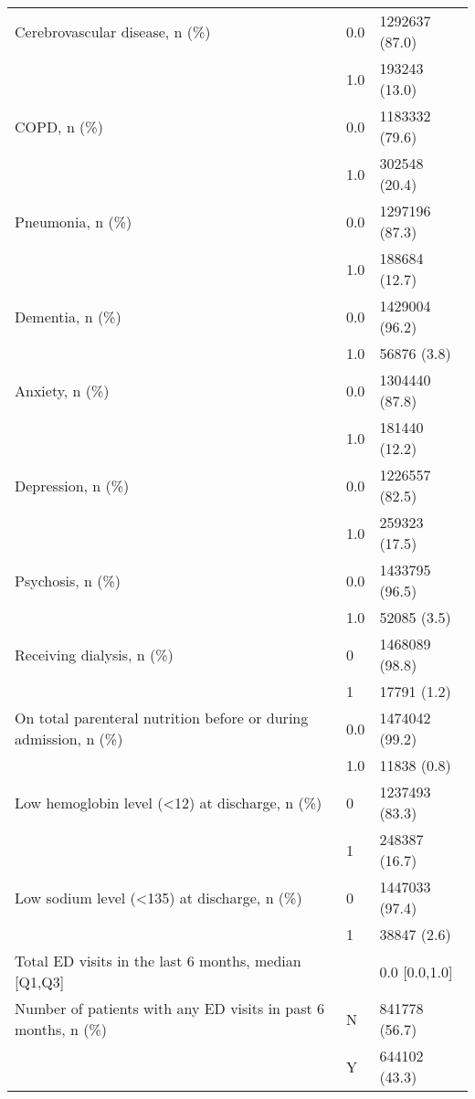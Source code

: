 \begin{tabular}{lll}
Cerebrovascular disease, n (\%) & 0.0 &     1292637 (87.0) \\
                                       & 1.0 &      193243 (13.0) \\
COPD, n (\%) & 0.0 &     1183332 (79.6) \\
                                       & 1.0 &      302548 (20.4) \\
Pneumonia, n (\%) & 0.0 &     1297196 (87.3) \\
                                       & 1.0 &      188684 (12.7) \\
Dementia, n (\%) & 0.0 &     1429004 (96.2) \\
                                       & 1.0 &        56876 (3.8) \\
Anxiety, n (\%) & 0.0 &     1304440 (87.8) \\
                                       & 1.0 &      181440 (12.2) \\
Depression, n (\%) & 0.0 &     1226557 (82.5) \\
                                       & 1.0 &      259323 (17.5) \\
Psychosis, n (\%) & 0.0 &     1433795 (96.5) \\
                                       & 1.0 &        52085 (3.5) \\
Receiving dialysis, n (\%) & 0 &     1468089 (98.8) \\
                                       & 1 &        17791 (1.2) \\
On total parenteral nutrition before or during admission, n (\%) & 0.0 &     1474042 (99.2) \\
                                       & 1.0 &        11838 (0.8) \\
Low hemoglobin level (<12) at discharge, n (\%) & 0 &     1237493 (83.3) \\
                                       & 1 &      248387 (16.7) \\
Low sodium level (<135) at discharge, n (\%) & 0 &     1447033 (97.4) \\
                                       & 1 &        38847 (2.6) \\
Total ED visits in the last 6 months, median [Q1,Q3] &   &      0.0 [0.0,1.0] \\
Number of patients with any ED visits in past 6 months, n (\%) & N &      841778 (56.7) \\
                                       & Y &      644102 (43.3) \\

\end{tabular}
